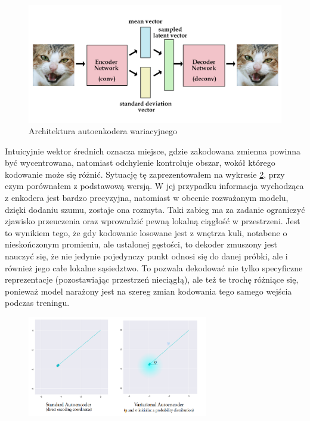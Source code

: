 \begin{figure}[h!]
    \centering
    \includegraphics[width=1.0\textwidth]{images/vae_model}
    \caption{Architektura autoenkodera wariacyjnego}
    \label{fig:vae_model}
\end{figure}

Intuicyjnie wektor średnich oznacza miejsce, gdzie zakodowana zmienna powinna być wycentrowana, natomiast odchylenie kontroluje obszar, wokół którego kodowanie może się różnić. Sytuację tę zaprezentowałem na wykresie \ref{fig:vae_vs_stand}, przy czym porównałem z podstawową wersją. W jej przypadku informacja wychodząca z enkodera jest bardzo precyzyjna, natomiast w obecnie rozważanym modelu, dzięki dodaniu szumu, zostaje ona rozmyta. Taki zabieg ma za zadanie ograniczyć zjawisko przeuczenia oraz wprowadzić pewną lokalną ciągłość w przestrzeni. Jest to wynikiem tego, że gdy kodowanie losowane jest z wnętrza kuli, notabene o nieskończonym promieniu, ale ustalonej gęstości, to dekoder zmuszony jest nauczyć się, że nie jedynie pojedynczy punkt odnosi się do danej próbki, ale i również jego całe lokalne sąsiedztwo. To pozwala dekodować nie tylko specyficzne reprezentacje (pozostawiając przestrzeń nieciągłą), ale też te trochę różniące się, ponieważ model narażony jest na szereg zmian kodowania tego samego wejścia podczas treningu.

\begin{figure}[h!]
    \centering
    \includegraphics[width=0.7\textwidth]{images/vae_vs_stand}
    \caption{}
    \label{fig:vae_vs_stand}
\end{figure}

